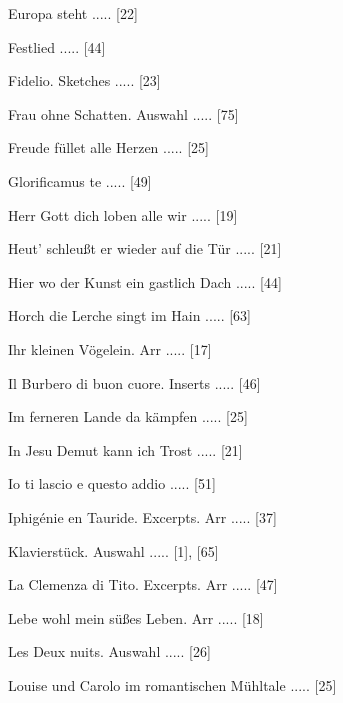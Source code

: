 \documentclass[a4paper, twocolumn, 11pt]{book}
\begin{document}
\newline 
Europa steht ..... [22]

\newline 
Festlied ..... [44]

\newline 
Fidelio. Sketches ..... [23]

\newline 
Frau ohne Schatten. Auswahl ..... [75]

\newline 
Freude füllet alle Herzen ..... [25]

\newline 
Glorificamus te ..... [49]

\newline 
Herr Gott dich loben alle wir ..... [19]

\newline 
Heut' schleußt er wieder auf die Tür ..... [21]

\newline 
Hier wo der Kunst ein gastlich Dach ..... [44]

\newline 
Horch die Lerche singt im Hain ..... [63]

\newline 
Ihr kleinen Vögelein. Arr ..... [17]

\newline 
Il Burbero di buon cuore. Inserts ..... [46]

\newline 
Im ferneren Lande da kämpfen ..... [25]

\newline 
In Jesu Demut kann ich Trost ..... [21]

\newline 
Io ti lascio e questo addio ..... [51]

\newline 
Iphigénie en Tauride. Excerpts. Arr ..... [37]

\newline 
Klavierstück. Auswahl ..... [1], [65]

\newline 
La Clemenza di Tito. Excerpts. Arr ..... [47]

\newline 
Lebe wohl mein süßes Leben. Arr ..... [18]

\newline 
Les Deux nuits. Auswahl ..... [26]

\newline 
Louise und Carolo im romantischen Mühltale ..... [25]
\end{document}
